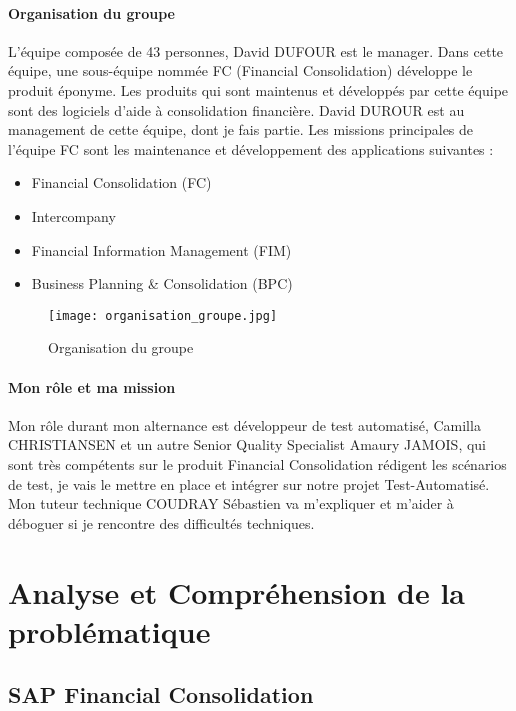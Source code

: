         \paragraph{Organisation du groupe} L'équipe composée de 43 personnes, David DUFOUR est le manager. Dans cette équipe, une sous-équipe nommée FC (Financial Consolidation) développe le produit éponyme. Les produits qui sont maintenus et développés par cette équipe sont des logiciels d’aide à consolidation financière. David DUROUR est au management de cette équipe, dont je fais partie. Les missions principales de l’équipe FC sont les maintenance et développement des applications suivantes :
        \begin{itemize}
            \item Financial Consolidation (FC)
            \item Intercompany
            \item Financial Information Management (FIM)
            \item Business Planning \& Consolidation (BPC)
        \end{itemize}
        
        \begin{figure}[H]
            \centering
            \texttt{[image: organisation\_groupe.jpg]}
            \caption{Organisation du groupe}
            \label{fig:group_organization_label}
        \end{figure}
        
        \paragraph{Mon rôle et ma mission}
        Mon rôle durant mon alternance est développeur de test automatisé, Camilla CHRISTIANSEN et un autre Senior Quality Specialist Amaury JAMOIS, qui sont très compétents sur le produit Financial Consolidation rédigent les scénarios de test, je vais le mettre en place et intégrer sur notre projet Test-Automatisé. Mon tuteur technique COUDRAY Sébastien va m'expliquer et m'aider à déboguer si je rencontre des difficultés techniques.
\newpage
\section{Analyse et Compréhension de la problématique}

\subsection{SAP Financial Consolidation}

